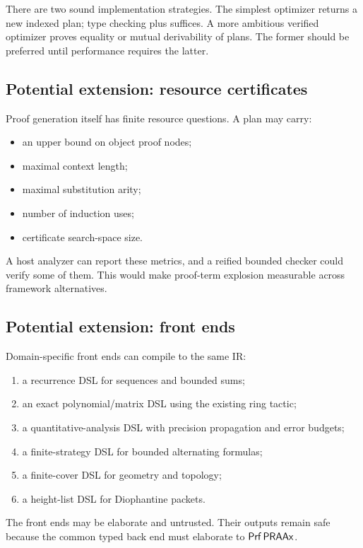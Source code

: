 There are two sound implementation strategies.  The simplest optimizer returns a new indexed plan;
type checking plus  suffices.  A more ambitious verified optimizer proves equality or
mutual derivability of plans.  The former should be preferred until performance requires the latter.

\subsection{Potential extension: resource certificates}

Proof generation itself has finite resource questions.  A plan may carry:

\begin{itemize}
\item an upper bound on object proof nodes;
\item maximal context length;
\item maximal substitution arity;
\item number of induction uses;
\item certificate search-space size.
\end{itemize}

A host analyzer can report these metrics, and a reified bounded checker could verify some of them.
This would make proof-term explosion measurable across framework alternatives.

\subsection{Potential extension: front ends}

Domain-specific front ends can compile to the same IR:

\begin{enumerate}
\item a recurrence DSL for sequences and bounded sums;
\item an exact polynomial/matrix DSL using the existing ring tactic;
\item a quantitative-analysis DSL with precision propagation and error budgets;
\item a finite-strategy DSL for bounded alternating formulas;
\item a finite-cover DSL for geometry and topology;
\item a height-list DSL for Diophantine packets.
\end{enumerate}

The front ends may be elaborate and untrusted.  Their outputs remain safe because the common typed
back end must elaborate to \(\mathsf{Prf}\,\mathsf{PRAAx}\).

